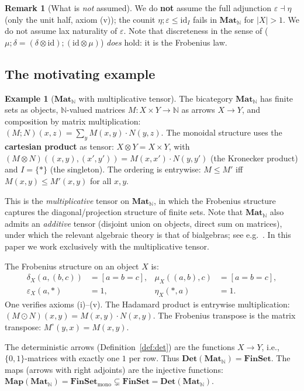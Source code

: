 \documentclass[11pt,a4paper]{article}
\theoremstyle{definition}
\newtheorem{example}[theorem]{Example}
\newtheorem{remark}[theorem]{Remark}
\newcommand{\op}{{\circ}}
\newcommand{\Had}{\odot}
\newcommand{\Mat}{\mathbf{Mat}}
\newcommand{\Map}{\mathbf{Map}}
\newcommand{\Det}{\mathbf{Det}}
\newcommand{\FinSet}{\mathbf{FinSet}}
\newcommand{\N}{\mathbb{N}}
\newcommand{\id}{\mathrm{id}}
\begin{document}
\begin{remark}[What is \emph{not} assumed]
We do \textbf{not} assume the full adjunction $\varepsilon \dashv \eta$ (only the unit half, axiom (v)); the counit $\eta;\varepsilon \leq \id_I$ fails in $\Mat_\N$ for $|X| > 1$. We do not assume lax naturality of $\varepsilon$. Note that discreteness in the sense of \cite{CW} ($\mu;\delta = (\delta \otimes \id);(\id \otimes \mu)$) \emph{does} hold: it is the Frobenius law.
\end{remark}

\subsection{The motivating example}

\begin{example}[$\Mat_\N$ with multiplicative tensor]\label{ex:mat-n}
The bicategory $\Mat_\N$ has finite sets as objects, $\N$-valued matrices $M \colon X \times Y \to \N$ as arrows $X \to Y$, and composition by matrix multiplication: $(M;N)(x,z) = \sum_y M(x,y) \cdot N(y,z)$. The monoidal structure uses the \textbf{cartesian product} as tensor: $X \otimes Y = X \times Y$, with $(M \otimes N)((x,y),(x',y')) = M(x,x') \cdot N(y,y')$ (the Kronecker product) and $I = \{*\}$ (the singleton). The ordering is entrywise: $M \leq M'$ iff $M(x,y) \leq M'(x,y)$ for all $x,y$.

This is the \emph{multiplicative} tensor on $\Mat_\N$, in which the Frobenius structure captures the diagonal/projection structure of finite sets. Note that $\Mat_\N$ also admits an \emph{additive} tensor (disjoint union on objects, direct sum on matrices), under which the relevant algebraic theory is that of bialgebras; see e.g.~\cite{BSS}. In this paper we work exclusively with the multiplicative tensor.

The Frobenius structure on an object $X$ is:
\begin{align*}
  \delta_X(a,(b,c)) &= [a{=}b{=}c], &
  \mu_X((a,b),c) &= [a{=}b{=}c], \\
  \varepsilon_X(a,*) &= 1, &
  \eta_X(*,a) &= 1.
\end{align*}
One verifies axioms (i)--(v). The Hadamard product is entrywise multiplication: $(M \Had N)(x,y) = M(x,y) \cdot N(x,y)$. The Frobenius transpose is the matrix transpose: $M^\op(y,x) = M(x,y)$.

The deterministic arrows (Definition~\ref{def:det}) are the functions $X \to Y$, i.e., $\{0,1\}$-matrices with exactly one $1$ per row. Thus $\Det(\Mat_\N) = \FinSet$. The maps (arrows with right adjoints) are the injective functions: $\Map(\Mat_\N) = \FinSet_{\mathrm{mono}} \subsetneq \FinSet = \Det(\Mat_\N)$.
\end{example}
\end{document}
